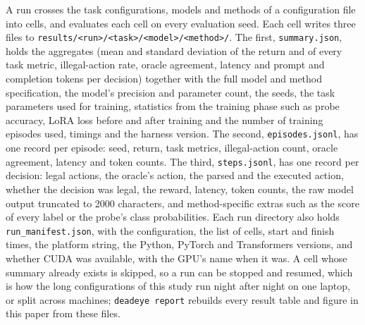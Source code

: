 A run crosses the task configurations, models and methods of a configuration file into cells, and evaluates each cell on every evaluation seed. Each cell writes three files to \texttt{results/<run>/<task>/<model>/<method>/}. The first, \texttt{summary.json}, holds the aggregates (mean and standard deviation of the return and of every task metric, illegal-action rate, oracle agreement, latency and prompt and completion tokens per decision) together with the full model and method specification, the model's precision and parameter count, the seeds, the task parameters used for training, statistics from the training phase such as probe accuracy, LoRA loss before and after training and the number of training episodes used, timings and the harness version. The second, \texttt{episodes.jsonl}, has one record per episode: seed, return, task metrics, illegal-action count, oracle agreement, latency and token counts. The third, \texttt{steps.jsonl}, has one record per decision: legal actions, the oracle's action, the parsed and the executed action, whether the decision was legal, the reward, latency, token counts, the raw model output truncated to 2000 characters, and method-specific extras such as the score of every label or the probe's class probabilities. Each run directory also holds \texttt{run\_manifest.json}, with the configuration, the list of cells, start and finish times, the platform string, the Python, PyTorch and Transformers versions, and whether CUDA was available, with the GPU's name when it was. A cell whose summary already exists is skipped, so a run can be stopped and resumed, which is how the long configurations of this study run night after night on one laptop, or split across machines; \texttt{deadeye report} rebuilds every result table and figure in this paper from these files.
